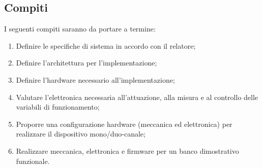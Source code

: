 \documentclass[lettersize,journal,onecolumn]{IEEEtran}
\begin{document}
\subsection{Compiti}
\noindent I seguenti compiti saranno da portare a termine:
\begin{enumerate}{}{}
\item Definire le specifiche di sistema in accordo con il relatore;
\item Definire l'architettura per l'implementazione;
\item Definire l'hardware necessario all'implementazione;
\item Valutare l'elettronica necessaria all'attuazione, alla misura e al controllo delle variabili di funzionamento;
\item Proporre una configurazione hardware (meccanica ed elettronica) per realizzare il dispositivo mono/duo-canale;
\item Realizzare meccanica, elettronica e firmware per un banco dimostrativo funzionale.
\end{enumerate}
\end{document}
